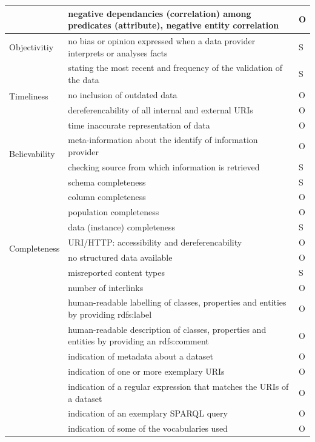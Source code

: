 \begin{longtable}{ | p{3cm} | p{10cm} | >{\centering\arraybackslash}p{2cm}| }
\cline{2-3}
& negative dependancies (correlation) among predicates (attribute), negative entity correlation & O\\
\hline
Objectivitiy & no bias or opinion expressed when a data provider interprets or analyses facts & S\\
\hline
\multirow{4}{*}{Timeliness} & stating the most recent and frequency of the validation of the data & S\\
\cline{2-3}
& no inclusion of outdated data & O\\
\cline{2-3}
& dereferencability of all internal and external URIs & O\\
\cline{2-3}
& time inaccurate representation of data &O\\
\hline
\multirow{2}{*}{Believability} & meta-information about the identify of information provider & O\\
\cline{2-3}
& checking source from which information is retrieved & S\\
\hline
\multirow{9}{*}{Completeness} & schema completeness & S\\
\cline{2-3}
& column completeness & O\\
\cline{2-3}
& population completeness & O\\
\cline{2-3}
& data (instance) completeness & S\\
\cline{2-3}
& URI/HTTP: accessibility and dereferencability & O\\
\cline{2-3}
& no structured data available & O\\
\cline{2-3}
& misreported content types & S\\
\cline{2-3}
& number of interlinks & O\\
\hline
\multirow{10}{*}{Understandibility} & human-readable labelling of classes, properties and entities by providing rdfs:label & O\\
\cline{2-3}
& human-readable description of classes, properties and entities by providing an rdfs:comment & O\\
\cline{2-3}
& indication of metadata about a dataset & O\\
\cline{2-3}
& indication of one or more exemplary URIs & O\\
\cline{2-3}
& indication of a regular expression that matches the URIs of a dataset & O\\
\cline{2-3}
& indication of an exemplary SPARQL query & O\\
\cline{2-3}
& indication of some of the vocabularies used & O\\
\cline{2-3}

\end{longtable}
